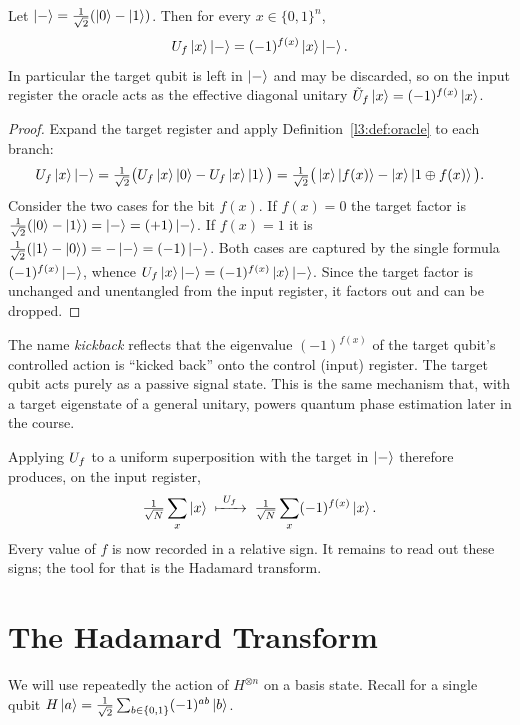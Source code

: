 \begin{lemma}
\label{l3:lem:kickback}
Let $\ket{-}=\tfrac{1}{\sqrt2}(\ket{0}-\ket{1})$. Then for every $x\in\{0,1\}^n$,
\[
  U_f\ket{x}\ket{-}=(-1)^{f(x)}\ket{x}\ket{-}.
\]
In particular the target qubit is left in $\ket{-}$ and may be discarded, so on
the input register the oracle acts as the effective diagonal unitary
$\tilde U_f\ket{x}=(-1)^{f(x)}\ket{x}$.
\end{lemma}

\begin{proof}
Expand the target register and apply Definition~\ref{l3:def:oracle} to each branch:
\[
  U_f\ket{x}\ket{-}
  =\tfrac{1}{\sqrt2}\big(U_f\ket{x}\ket{0}-U_f\ket{x}\ket{1}\big)
  =\tfrac{1}{\sqrt2}\big(\ket{x}\ket{f(x)}-\ket{x}\ket{1\oplus f(x)}\big).
\]
Consider the two cases for the bit $f(x)$. If $f(x)=0$ the target factor is
$\tfrac{1}{\sqrt2}(\ket{0}-\ket{1})=\ket{-}=(+1)\ket{-}$. If $f(x)=1$ it is
$\tfrac{1}{\sqrt2}(\ket{1}-\ket{0})=-\ket{-}=(-1)\ket{-}$. Both cases are captured
by the single formula $(-1)^{f(x)}\ket{-}$, whence
$U_f\ket{x}\ket{-}=(-1)^{f(x)}\ket{x}\ket{-}$. Since the target factor is unchanged
and unentangled from the input register, it factors out and can be dropped.
\end{proof}

\begin{remark}
The name \emph{kickback} reflects that the eigenvalue $(-1)^{f(x)}$ of the target
qubit's controlled action is ``kicked back'' onto the control (input) register.
The target qubit acts purely as a passive signal state. This is the same mechanism
that, with a target eigenstate of a general unitary, powers quantum phase
estimation later in the course.
\end{remark}

Applying $U_f$ to a uniform superposition with the target in $\ket{-}$ therefore
produces, on the input register,
\[
  \tfrac{1}{\sqrt{N}}\sum_{x}\ket{x}\;\xmapsto{\ \Uf\ }\;
  \tfrac{1}{\sqrt{N}}\sum_{x}(-1)^{f(x)}\ket{x}.
\]
Every value of $f$ is now recorded in a relative sign. It remains to read out
these signs; the tool for that is the Hadamard transform.

\section{The Hadamard Transform}

We will use repeatedly the action of $H^{\otimes n}$ on a basis state. Recall for a
single qubit $H\ket{a}=\tfrac{1}{\sqrt2}\sum_{b\in\{0,1\}}(-1)^{ab}\ket{b}$.

